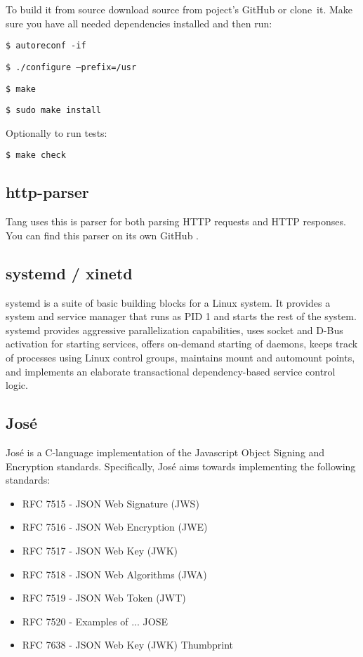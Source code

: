\documentclass[../xdudla00-porting-Tang-to-Open-WRT.tex]{subfiles}
\begin{document}
To build it from source download source from poject's GitHub \cite{github} or clone~it.
Make sure you have all needed dependencies installed and then run:

{\tt \$ autoreconf -if}

{\tt \$ ./configure --prefix=/usr}

{\tt \$ make}

{\tt \$ sudo make install}

Optionally to run tests:

{\tt \$ make check}

\subsection{http-parser}\label{http-parser}
Tang uses this is parser for both parsing HTTP requests and HTTP responses.
You can find this parser on its own GitHub \cite{http-parser}.

\subsection{systemd / xinetd}\label{systemd}
systemd \cite{systemd} is a suite of basic building blocks for a Linux \cite{linux} system.
It provides a system and service manager that runs as PID \cite{pid} 1 and starts the rest of the system.
systemd provides aggressive parallelization capabilities, uses socket \cite{socket} and D-Bus \cite{Dbus} activation for starting services,
 offers on-demand starting of daemons, keeps track of processes using Linux control groups, maintains mount and automount points,
 and implements an elaborate transactional dependency-based service control logic.

\subsection{José}\label{jose}
José \cite{Jos} is a C-language implementation of the Javascript \cite{javascript} Object Signing and Encryption standards.
Specifically, José aims towards implementing the following standards:
\begin{itemize}
   \item RFC 7515 - JSON Web Signature (JWS)        \cite{JWS}
   \item RFC 7516 - JSON Web Encryption (JWE)       \cite{JWE}
   \item RFC 7517 - JSON Web Key (JWK)              \cite{JWK}
   \item RFC 7518 - JSON Web Algorithms (JWA)       \cite{JWA}
   \item RFC 7519 - JSON Web Token (JWT)            \cite{JWT}
   \item RFC 7520 - Examples of ... JOSE            \cite{exJose}
   \item RFC 7638 - JSON Web Key (JWK) Thumbprint   \cite{JWK}
\end{itemize}
\end{document}
